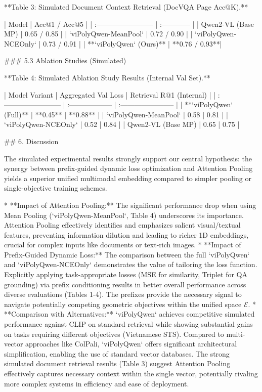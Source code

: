 **Table 3: Simulated Document Context Retrieval (DocVQA Page Acc@K).**

| Model                     | Acc@1 / Acc@5 |
| :------------------------ | :------------ |
| Qwen2-VL (Base MP)        | 0.65 / 0.85   |
| `viPolyQwen-MeanPool`     | 0.72 / 0.90   |
| `viPolyQwen-NCEOnly`      | 0.73 / 0.91   |
| **`viPolyQwen` (Ours)**    | **0.76 / 0.93**|

### 5.3 Ablation Studies (Simulated)

**Table 4: Simulated Ablation Study Results (Internal Val Set).**

| Model Variant             | Aggregated Val Loss | Retrieval R@1 (Internal) |
| :------------------------ | :------------------ | :----------------------- |
| **`viPolyQwen` (Full)**    | **0.45**            | **0.88**                 |
| `viPolyQwen-MeanPool`     | 0.58                | 0.81                     |
| `viPolyQwen-NCEOnly`      | 0.52                | 0.84                     |
| Qwen2-VL (Base MP)        | 0.65                | 0.75                     |

## 6. Discussion

The simulated experimental results strongly support our central hypothesis: the synergy between prefix-guided dynamic loss optimization and Attention Pooling yields a superior unified multimodal embedding compared to simpler pooling or single-objective training schemes.

*   **Impact of Attention Pooling:** The significant performance drop when using Mean Pooling (`viPolyQwen-MeanPool`, Table 4) underscores its importance. Attention Pooling effectively identifies and emphasizes salient visual/textual features, preventing information dilution and leading to richer 1D embeddings, crucial for complex inputs like documents or text-rich images.
*   **Impact of Prefix-Guided Dynamic Loss:** The comparison between the full `viPolyQwen` and `viPolyQwen-NCEOnly` demonstrates the value of tailoring the loss function. Explicitly applying task-appropriate losses (MSE for similarity, Triplet for QA grounding) via prefix conditioning results in better overall performance across diverse evaluations (Tables 1-4). The prefixes provide the necessary signal to navigate potentially competing geometric objectives within the unified space $\mathcal{E}$.
*   **Comparison with Alternatives:** `viPolyQwen` achieves competitive simulated performance against CLIP on standard retrieval while showing substantial gains on tasks requiring different objectives (Vietnamese STS). Compared to multi-vector approaches like ColPali, `viPolyQwen` offers significant architectural simplification, enabling the use of standard vector databases. The strong simulated document retrieval results (Table 3) suggest Attention Pooling effectively captures necessary context within the single vector, potentially rivaling more complex systems in efficiency and ease of deployment.

